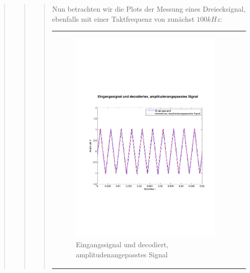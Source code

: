 \begin{quote}
\begin{quote}
\begin{quote}
            
            Nun betrachten wir die Plots der Messung eines Dreiecksignal, ebenfalls
            mit einer Taktfrequenz von zunächst $100 kHz$:
            \begin{center}
                \begin{tabular}{ll}
                
                \hspace{-4cm}
                    \begin{minipage}{0.6\textwidth}
                        \begin{figure}[H]
                            \includegraphics[scale=0.4, trim = 0.8cm 7cm 0.8cm
                            8.5cm, clip]
                            {./Bilder/drei100_Eingang_vs_DecodiertAmpl-angepasst}
                              \caption{Eingangssignal und decodiert, \newline
                              amplitudenangepasstes Signal}
                        \end{figure}
                    \end{minipage}
                    

\end{tabular}
\end{center}
\end{quote}
\end{quote}
\end{quote}
